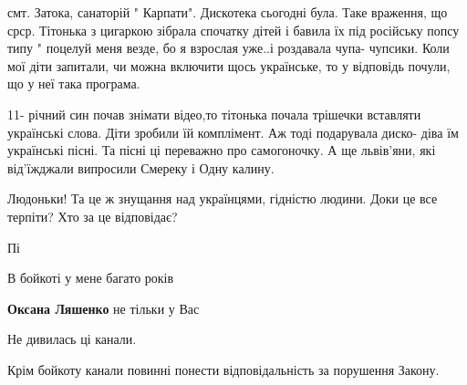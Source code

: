 \begin{itemize}
 

смт. Затока, санаторій " Карпати". Дискотека сьогодні була. Таке враження, що
срср. Тітонька з цигаркою зібрала спочатку дітей і бавила їх під російську
попсу типу " поцелуй меня везде, бо я взрослая уже..і роздавала чупа- чупсики.
Коли мої діти запитали, чи можна включити щось українське, то у відповідь
почули, що у неї така програма.

11- річний син почав знімати відео,то тітонька почала трішечки вставляти
українські слова. Діти зробили їй комплімент. Аж тоді подарувала диско- діва їм
українські пісні. Та пісні ці переважно про самогоночку. А ще львів'яни, які
від'їжджали випросили Смереку і Одну калину.

Людоньки! Та це ж знущання над українцями, гідністю людини. Доки це все
терпіти? Хто за це відповідає?


 
Пі

 
В бойкоті у мене багато років

\begin{itemize}
 
\textbf{Оксана Ляшенко} не тільки у Вас
\end{itemize}

 

Не дивилась ці канали.

Крім бойкоту канали повинні понести відповідальність за порушення Закону.


\end{itemize}

